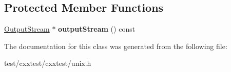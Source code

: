 \subsection*{Protected Member Functions}
\begin{DoxyCompactItemize}
\item 
\hypertarget{classCxxTest_1_1UNIXErrorFormatter_a7c5adedf1b77234d78bae611b02fd398}{\hyperlink{classCxxTest_1_1OutputStream}{Output\-Stream} $\ast$ {\bfseries output\-Stream} () const }\label{classCxxTest_1_1UNIXErrorFormatter_a7c5adedf1b77234d78bae611b02fd398}

\end{DoxyCompactItemize}


The documentation for this class was generated from the following file\-:\begin{DoxyCompactItemize}
\item 
test/cxxtest/cxxtest/unix.\-h\end{DoxyCompactItemize}
